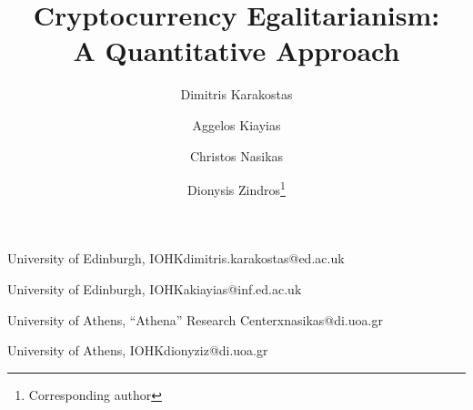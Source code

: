 
\title{Cryptocurrency Egalitarianism:\protect\\A Quantitative Approach} %


    \author{Dimitris Karakostas}{University of Edinburgh, IOHK}{dimitris.karakostas@ed.ac.uk}{}{}%

    \author{Aggelos Kiayias}{University of Edinburgh, IOHK}{akiayias@inf.ed.ac.uk}{}{}
    \author{Christos Nasikas}{University of Athens, ``Athena'' Research Center}{xnasikas@di.uoa.gr}{}{}
    \author{Dionysis Zindros\footnote{Corresponding author}}{University of Athens, IOHK}{dionyziz@di.uoa.gr}{}{}

